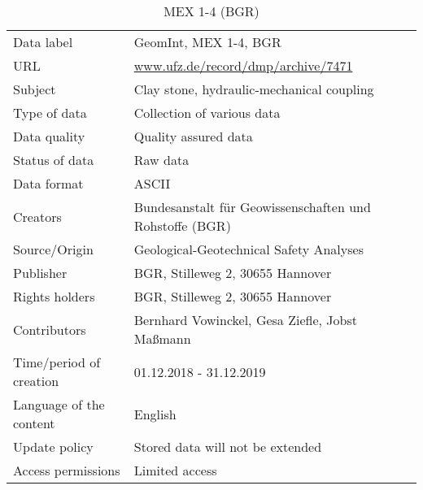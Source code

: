 \begin{table}[!ht]
\caption{MEX 1-4 (BGR)}
\label{tab:dms-mex14}
\small
\begin{tabular}{R{3.5cm}|L{7cm}}
\hline
%
Data label & GeomInt, MEX 1-4, BGR  \\
URL & \url{www.ufz.de/record/dmp/archive/7471} \\
Subject  & Clay stone, hydraulic-mechanical coupling  \\
Type of data  & Collection of various data  \\
Data quality  & Quality assured data  \\
Status of data  & Raw data \\
Data format  & ASCII \\
Creators  & Bundesanstalt f\"ur Geowissenschaften und Rohstoffe (BGR) \\
Source/Origin & Geological-Geotechnical Safety Analyses \\
Publisher  & BGR, Stilleweg 2, 30655 Hannover \\
Rights holders & BGR, Stilleweg 2, 30655 Hannover \\
Contributors & Bernhard Vowinckel, Gesa Ziefle, Jobst Ma\ss mann \\
Time/period of creation & 01.12.2018 - 31.12.2019 \\
Language of the content & English \\
Update policy & Stored data will not be extended  \\
Access permissions & Limited access \\
%
\hline
\end{tabular}
\end{table}